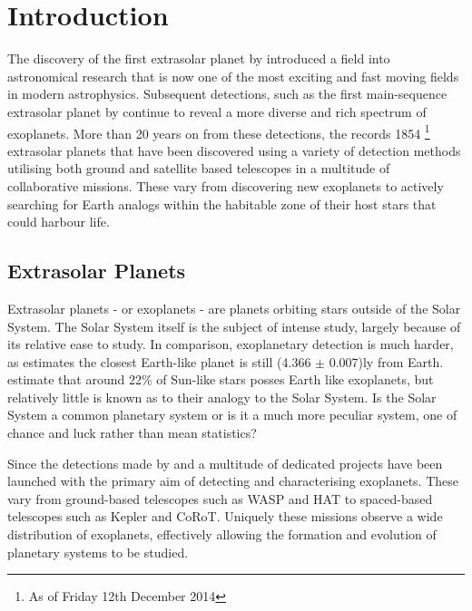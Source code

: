 \documentclass{report}
\begin{document}
\section{Introduction}
The discovery of the first extrasolar planet by \textcite{first} introduced a field into astronomical research that is now one of the most exciting and fast moving fields in modern astrophysics. Subsequent detections, such as the first main-sequence extrasolar planet by \textcite{MQ} continue to reveal a more diverse and rich spectrum of exoplanets. More than 20 years on from these detections, the \textcite{exo} records 1854 \footnote{As of Friday 12th December 2014} extrasolar planets that have been discovered using a variety of detection methods utilising both ground and satellite based telescopes in a multitude of collaborative missions. These vary from discovering new exoplanets to actively searching for Earth analogs within the habitable zone of their host stars that could harbour life.

\subsection{Extrasolar Planets}
Extrasolar planets - or exoplanets - are planets orbiting stars outside of the Solar System. The Solar System itself is the subject of intense study, largely because of its relative ease to study. In comparison, exoplanetary detection is much harder, as \textcite{close} estimates the closest Earth-like planet is still (4.366 $\pm$ 0.007)ly from Earth. \textcite{prevalent} estimate that around 22\% of Sun-like stars posses Earth like exoplanets, but relatively little is known as to their analogy to the Solar System. Is the Solar System a common planetary system or is it a much more peculiar system, one of chance and luck rather than mean statistics?  

Since the detections made by \citeauthor{first} and \citeauthor{MQ} a multitude of dedicated projects have been launched with the primary aim of detecting and characterising exoplanets. These vary from ground-based telescopes such as WASP and HAT to spaced-based telescopes such as Kepler and CoRoT. Uniquely these missions observe a wide distribution of exoplanets, effectively allowing the formation and evolution of planetary systems to be studied. 
\end{document}
